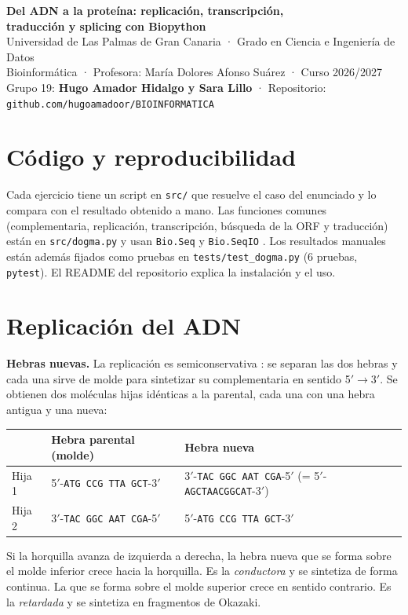 \documentclass[11pt,a4paper]{article}
\newcommand{\sq}[1]{\texttt{#1}}
\begin{document}
\begin{center}
{\Large\bfseries Del ADN a la proteína: replicación, transcripción,\\[1pt] traducción y splicing con Biopython}\\[5pt]
{\small Universidad de Las Palmas de Gran Canaria · Grado en Ciencia e Ingeniería de Datos}\\[1pt]
{\small Bioinformática · Profesora: María Dolores Afonso Suárez · Curso 2026/2027}\\[1pt]
{\small Grupo 19: \textbf{Hugo Amador Hidalgo y Sara Lillo} · Repositorio: \sq{github.com/hugoamadoor/BIOINFORMATICA}}
\end{center}
\vspace{-6pt}

\section*{Código y reproducibilidad}
Cada ejercicio tiene un script en \sq{src/} que resuelve el caso del enunciado y lo compara con el resultado obtenido a mano. Las funciones comunes (complementaria, replicación, transcripción, búsqueda de la ORF y traducción) están en \sq{src/dogma.py} y usan \sq{Bio.Seq} y \sq{Bio.SeqIO} \cite{biopython}. Los resultados manuales están además fijados como pruebas en \sq{tests/test\_dogma.py} (6 pruebas, \sq{pytest}). El README del repositorio explica la instalación y el uso.

\section{Replicación del ADN}
\textbf{Hebras nuevas.} La replicación es semiconservativa \cite{ws,ms}: se separan las dos hebras y cada una sirve de molde para sintetizar su complementaria en sentido 5$'\!\to$3$'$. Se obtienen dos moléculas hijas idénticas a la parental, cada una con una hebra antigua y una nueva:
\begin{center}\small
\begin{tabular}{lll}
\toprule
 & Hebra parental (molde) & Hebra nueva \\
\midrule
Hija 1 & 5$'$-\sq{ATG CCG TTA GCT}-3$'$ & 3$'$-\sq{TAC GGC AAT CGA}-5$'$ \quad(= 5$'$-\sq{AGCTAACGGCAT}-3$'$)\\
Hija 2 & 3$'$-\sq{TAC GGC AAT CGA}-5$'$ & 5$'$-\sq{ATG CCG TTA GCT}-3$'$\\
\bottomrule
\end{tabular}
\end{center}
Si la horquilla avanza de izquierda a derecha, la hebra nueva que se forma sobre el molde inferior crece hacia la horquilla. Es la \emph{conductora} y se sintetiza de forma continua. La que se forma sobre el molde superior crece en sentido contrario. Es la \emph{retardada} y se sintetiza en fragmentos de Okazaki.
\end{document}

